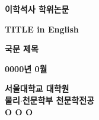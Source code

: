 \begin{titlepage}
    \begin{center}
    \huge
    \textbf{이학석사 학위논문}    
    \vspace*{2cm}
    
    \LARGE
    \textbf{TITLE in English}
    
    \vspace{1.0cm}
    \LARGE
    \textbf{국문 제목}
    
    \vspace{2.0cm}
    
    \textbf{0000년 0월}
    
    \vfill
    
    
    
    \Large

    \textbf{서울대학교 대학원}\\
    \textbf{물리$\cdot$천문학부 천문학전공}\\
    \vspace{0.5cm}
    \textbf{O O O}
    
    \end{center}
\end{titlepage}

